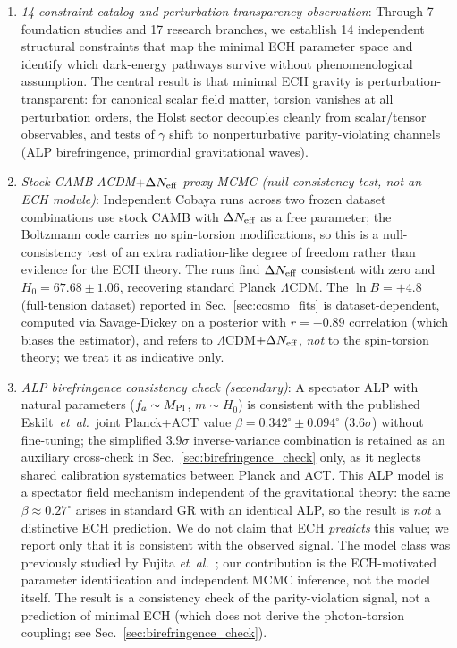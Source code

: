 \documentclass[aps,prd,twocolumn,superscriptaddress,showpacs,preprintnumbers,nofootinbib,longbibliography,floatfix]{revtex4-2}
\newcommand{\MPl}{M_{\rm Pl}}
\newcommand{\Neff}{N_{\rm eff}}
\newcommand{\etal}{\textit{et~al.}}
\begin{document}
\begin{enumerate}[leftmargin=*]
\item \textit{14-constraint catalog and perturbation-transparency observation}: Through 7 foundation studies and 17 research branches, we establish 14 independent structural constraints that map the minimal ECH parameter space and identify which dark-energy pathways survive without phenomenological assumption. The central result is that minimal ECH gravity is perturbation-transparent: for canonical scalar field matter, torsion vanishes at all perturbation orders, the Holst sector decouples cleanly from scalar/tensor observables, and tests of $\gamma$ shift to nonperturbative parity-violating channels (ALP birefringence, primordial gravitational waves).

\item \textit{Stock-CAMB $\Lambda$CDM$+\Delta\Neff$ proxy MCMC (null-consistency test, not an ECH module)}: Independent Cobaya runs across two frozen dataset combinations use stock CAMB with $\Delta\Neff$ as a free parameter; the Boltzmann code carries no spin-torsion modifications, so this is a null-consistency test of an extra radiation-like degree of freedom rather than evidence for the ECH theory. The runs find $\Delta\Neff$ consistent with zero and $H_0 = 67.68 \pm 1.06$, recovering standard Planck $\Lambda$CDM. The $\ln B = +4.8$ (full-tension dataset) reported in Sec.~\ref{sec:cosmo_fits} is dataset-dependent, computed via Savage-Dickey on a posterior with $r=-0.89$ correlation (which biases the estimator), and refers to $\Lambda$CDM$+\Delta\Neff$, \emph{not} to the spin-torsion theory; we treat it as indicative only.

\item \textit{ALP birefringence consistency check (secondary)}: A spectator ALP with natural parameters ($f_a \sim \MPl$, $m \sim H_0$) is consistent with the published Eskilt~\etal\ joint Planck+ACT value $\beta = 0.342^\circ \pm 0.094^\circ$ ($3.6\sigma$) without fine-tuning; the simplified $3.9\sigma$ inverse-variance combination is retained as an auxiliary cross-check in Sec.~\ref{sec:birefringence_check} only, as it neglects shared calibration systematics between Planck and ACT. This ALP model is a spectator field mechanism independent of the gravitational theory: the same $\beta \approx 0.27^\circ$ arises in standard GR with an identical ALP, so the result is \emph{not} a distinctive ECH prediction. We do not claim that ECH \emph{predicts} this value; we report only that it is consistent with the observed signal. The model class was previously studied by Fujita \etal~\cite{Fujita2021}; our contribution is the ECH-motivated parameter identification and independent MCMC inference, not the model itself. The result is a consistency check of the parity-violation signal, not a prediction of minimal ECH (which does not derive the photon-torsion coupling; see Sec.~\ref{sec:birefringence_check}).
\end{enumerate}
\end{document}
